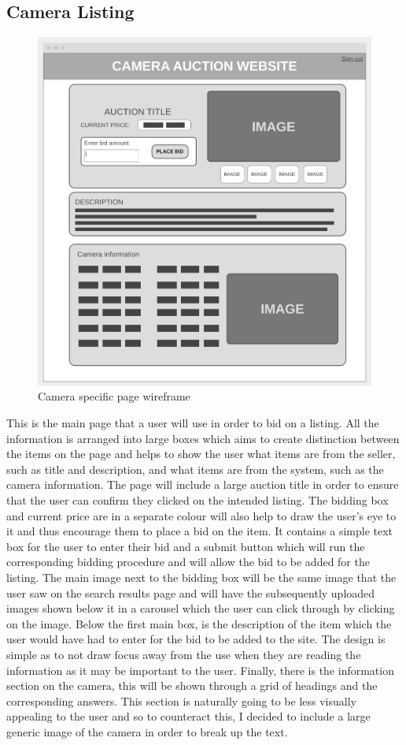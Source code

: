 \subsection{Camera Listing}
\begin{figure}[H]
    \centering
    \includegraphics[scale=0.4]{ch2_design/wire_exlisting.png}
    \caption{Camera specific page wireframe}
    \label{fig:wire_listing}
\end{figure}
This is the main page that a user will use in order to bid on a listing. All the information is arranged into large boxes which aims to create distinction between the items on the page and helps to show the user what items are from the seller, such as title and description, and what items are from the system, such as the camera information. The page will include a large auction title in order to ensure that the user can confirm they clicked on the intended listing. The bidding box and current price are in a separate colour will also help to draw the user’s eye to it and thus encourage them to place a bid on the item. It contains a simple text box for the user to enter their bid and a submit button which will run the corresponding bidding procedure and will allow the bid to be added for the listing. The main image next to the bidding box will be the same image that the user saw on the search results page and will have the subsequently uploaded images shown below it in a carousel which the user can click through by clicking on the image. Below the first main box, is the description of the item which the user would have had to enter for the bid to be added to the site. The design is simple as to not draw focus away from the use when they are reading the information as it may be important to the user. Finally, there is the information section on the camera, this will be shown through a grid of headings and the corresponding answers. This section is naturally going to be less visually appealing to the user and so to counteract this, I decided to include a large generic image of the camera in order to break up the text. 

